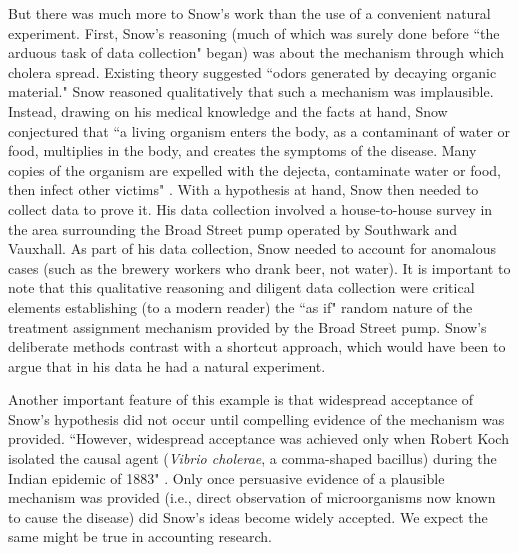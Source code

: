 \documentclass[12pt,reqno,titlepage]{amsart}
\begin{document}
\begin{doublespace}
But there was much more to Snow's work than the use of a convenient natural experiment.
First, Snow's reasoning (much of which was surely done before ``the arduous task of data collection" began) was about the  mechanism through which cholera spread. Existing theory suggested ``odors generated by decaying organic material."
Snow reasoned qualitatively that such a mechanism was implausible.
Instead, drawing on his medical knowledge and the facts at hand, Snow conjectured that ``a living organism enters the body, as a contaminant of water or food, multiplies in the body, and creates the symptoms of the disease. Many copies of the organism are expelled with the dejecta, contaminate water or food, then infect other victims" \citep[p.\,342]{Freedman:2009ur}.
With a hypothesis at hand, Snow then needed to collect data to prove it.
His data collection involved a house-to-house survey in the area surrounding the Broad Street pump operated by  Southwark and Vauxhall.
As part of his data collection, Snow needed to account for anomalous cases (such as the brewery workers who drank beer, not water).
It is important to note that this qualitative reasoning and diligent data collection were critical elements establishing (to a modern reader) the ``as if" random nature of the treatment assignment mechanism provided by the Broad Street pump. Snow's deliberate methods contrast with a shortcut approach, which would have been to argue that in his data he had a natural experiment.

Another important feature of this example is that widespread acceptance of Snow's hypothesis did not occur until compelling evidence of the mechanism was provided.
``However, widespread acceptance was achieved only when Robert Koch isolated the causal agent (\emph{Vibrio cholerae}, a comma-shaped bacillus) during the Indian epidemic of 1883"  \citep[p.\,342]{Freedman:2009ur}.
Only once persuasive evidence of a plausible mechanism was provided (i.e., direct observation of microorganisms now known to cause the disease) did Snow's ideas become widely accepted. We expect the same might be true in accounting research.


\end{doublespace}
\end{document}
